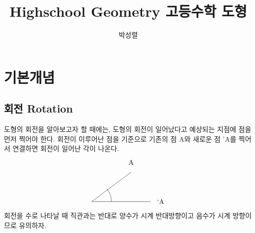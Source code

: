 \documentclass{article}
\title{Highschool Geometry 고등수학 도형}
\author{박성렬}
\begin{document}
\maketitle
\section{기본개념}
\subsection{회전 Rotation}
도형의 회전을 알아보고자 할 때에는, 도형의 회전이 일어났다고 예상되는 지점에 점을 먼저 찍어야 한다. 회전이 이루어난 점을 기준으로 기존의 점 A와 새로운 점 'A를 찍어서 연결하면 회전이 일어난 각이 나온다.\\
$$
\begin{tikzpicture}

\draw (1,3) -- (-1,1.5) -- (2,1.5);
\node at (1,3.5) {\\A};
\node at (-1,1.5) {};
\node at (2.5,1.5) {\\`A};
\draw (-0.234,2.1428) arc (40.0022:0:1);
\end{tikzpicture}
$$
회전을 수로 나타날 때 직관과는 반대로 양수가 시계 반대방향이고 음수가 시계 방향이므로 유의하자.
\end{document}
